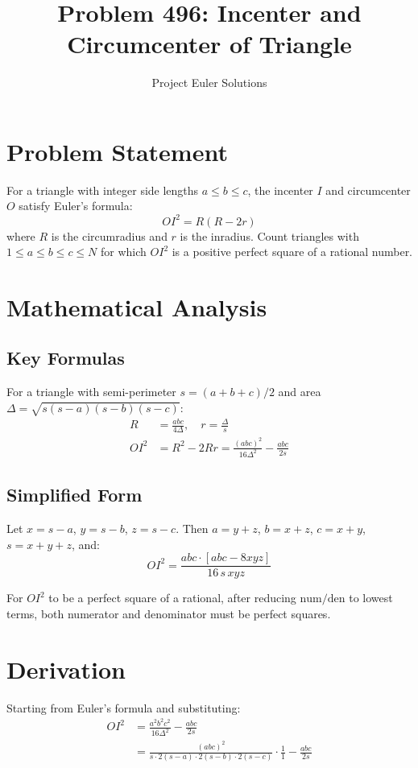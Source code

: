 \documentclass[11pt]{article}
\title{Problem 496: Incenter and Circumcenter of Triangle}
\author{Project Euler Solutions}
\date{}
\begin{document}
\maketitle

\section{Problem Statement}
For a triangle with integer side lengths $a \le b \le c$, the incenter $I$ and circumcenter $O$ satisfy Euler's formula:
\[
OI^2 = R(R - 2r)
\]
where $R$ is the circumradius and $r$ is the inradius. Count triangles with $1 \le a \le b \le c \le N$ for which $OI^2$ is a positive perfect square of a rational number.

\section{Mathematical Analysis}

\subsection{Key Formulas}
For a triangle with semi-perimeter $s = (a+b+c)/2$ and area $\Delta = \sqrt{s(s-a)(s-b)(s-c)}$:
\begin{align}
R &= \frac{abc}{4\Delta}, \quad r = \frac{\Delta}{s} \\[6pt]
OI^2 &= R^2 - 2Rr = \frac{(abc)^2}{16\Delta^2} - \frac{abc}{2s}
\end{align}

\subsection{Simplified Form}
Let $x = s-a$, $y = s-b$, $z = s-c$. Then $a = y+z$, $b = x+z$, $c = x+y$, $s = x+y+z$, and:
\[
OI^2 = \frac{abc \cdot [abc - 8xyz]}{16\,s\,xyz}
\]

For $OI^2$ to be a perfect square of a rational, after reducing $\text{num}/\text{den}$ to lowest terms, both numerator and denominator must be perfect squares.

\section{Derivation}
Starting from Euler's formula and substituting:
\begin{align}
OI^2 &= \frac{a^2b^2c^2}{16\Delta^2} - \frac{abc}{2s} \\
&= \frac{(abc)^2}{s \cdot 2(s-a) \cdot 2(s-b) \cdot 2(s-c)} \cdot \frac{1}{1} - \frac{abc}{2s}
\end{align}
\end{document}

